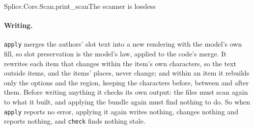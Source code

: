 \documentclass[acmsmall,screen,review,anonymous,nonacm]{acmart}
\begin{document}
\begin{leansource}[sum=vPTJWUU0sF]{Splice.Core.Scan.print_scan}{The scanner is lossless}
\end{leansource}

\paragraph{Writing.} \verb|apply| merges the authors' slot text into a new
rendering with the model's own \textsf{fill}, so slot preservation is the
model's law, applied to the code's merge.
It rewrites each item that changes within the item's own characters, so the
text outside items, and the items' places, never change;
and within an item it rebuilds only the options and the region, keeping the
characters before, between and after them.
Before writing anything it checks its own output: the files must scan again
to what it built, and applying the bundle again must find nothing to do.
So when \verb|apply| reports no error, applying it again writes nothing,
changes nothing and reports nothing, and \verb|check| finds nothing
stale.
\end{document}
